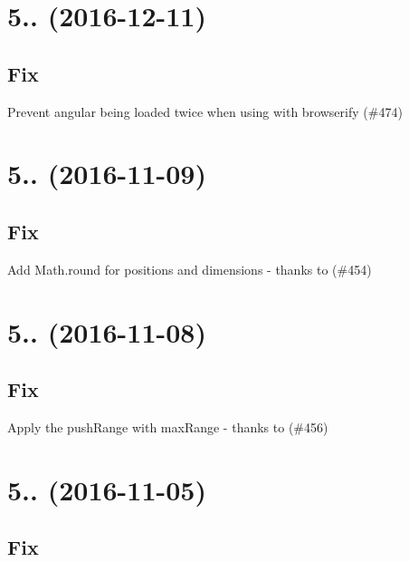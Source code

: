 \section*{5.. (2016-\/12-\/11)}

\subsection*{Fix}


\begin{DoxyItemize}
\item Prevent angular being loaded twice when using with browserify (\#474)
\end{DoxyItemize}

\section*{5.. (2016-\/11-\/09)}

\subsection*{Fix}


\begin{DoxyItemize}
\item Add Math.\+round for positions and dimensions -\/ thanks to  (\#454)
\end{DoxyItemize}

\section*{5.. (2016-\/11-\/08)}

\subsection*{Fix}


\begin{DoxyItemize}
\item Apply the push\+Range with max\+Range -\/ thanks to  (\#456)
\end{DoxyItemize}

\section*{5.. (2016-\/11-\/05)}

\subsection*{Fix}


